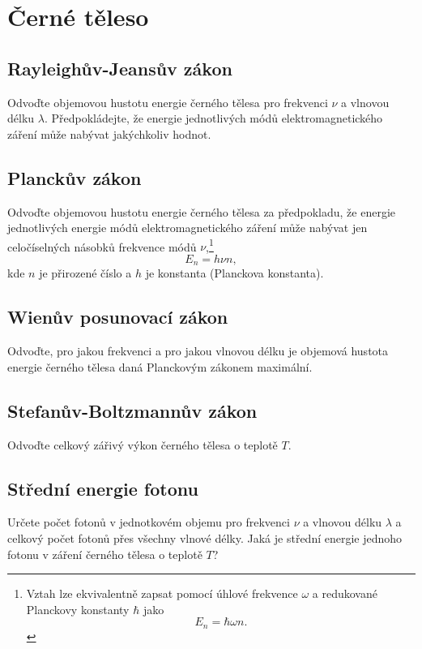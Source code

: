 \section{Černé těleso}
\subsection{Rayleighův-Jeansův zákon}
    Odvoďte objemovou hustotu energie černého tělesa pro frekvenci $\nu$ a vlnovou délku $\lambda$.
    Předpokládejte, že energie jednotlivých módů elektromagnetického záření může nabývat jakýchkoliv hodnot.

\subsection{Planckův zákon}
    Odvoďte objemovou hustotu energie černého tělesa za předpokladu, že energie jednotlivých energie módů elektromagnetického záření může nabývat jen celočíselných násobků frekvence módů $\nu$,\footnote{
        Vztah lze ekvivalentně zapsat pomocí úhlové frekvence $\omega$ a redukované Planckovy konstanty $\hbar$ jako
        \begin{equation}
            E_{n}=\hbar\omega n.
        \end{equation}
    }
    \begin{equation*}
        E_{n}=h\nu n,
    \end{equation*}
    kde $n$ je přirozené číslo a $h$ je konstanta (Planckova konstanta).

\subsection{Wienův posunovací zákon}
    Odvoďte, pro jakou frekvenci a pro jakou vlnovou délku je objemová hustota energie černého tělesa daná Planckovým zákonem maximální.

\subsection{Stefanův-Boltzmannův zákon}
    Odvoďte celkový zářivý výkon černého tělesa o teplotě $T$.

\subsection{Střední energie fotonu}
    Určete počet fotonů v jednotkovém objemu pro frekvenci $\nu$ a vlnovou délku $\lambda$ a celkový počet fotonů přes všechny vlnové délky.
    Jaká je střední energie jednoho fotonu v záření černého tělesa o teplotě $T$?


